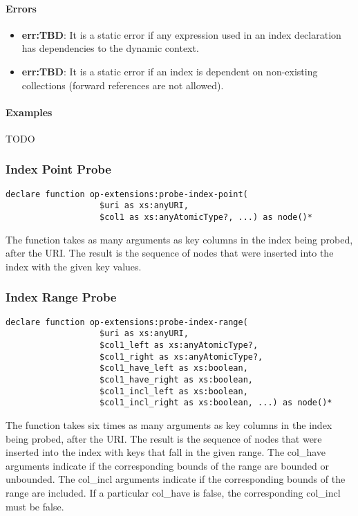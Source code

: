 \documentclass[]{article}
\begin{document}
\paragraph{Errors}
\begin{itemize}
  \item \textbf{err:TBD}: It is a static error if any expression used in an index declaration has dependencies to the dynamic context.
  \item \textbf{err:TBD}: It is a static error if an index is dependent on non-existing collections (forward references are not allowed).
\end{itemize}

\paragraph{Examples}
TODO

\subsubsection{Index Point Probe}
\begin{verbatim}
declare function op-extensions:probe-index-point(
                   $uri as xs:anyURI, 
                   $col1 as xs:anyAtomicType?, ...) as node()*
\end{verbatim}

\noindent
The function takes as many arguments as key columns in the index being probed, after the URI. The result is the sequence of nodes that were inserted into the index with the given key values.

\subsubsection{Index Range Probe}
\begin{verbatim}
declare function op-extensions:probe-index-range(
                   $uri as xs:anyURI,
                   $col1_left as xs:anyAtomicType?,
                   $col1_right as xs:anyAtomicType?,
                   $col1_have_left as xs:boolean,
                   $col1_have_right as xs:boolean,
                   $col1_incl_left as xs:boolean,
                   $col1_incl_right as xs:boolean, ...) as node()*
\end{verbatim}

\noindent
The function takes six times as many arguments as key columns in the index being probed, after the URI. The result is the sequence of nodes that were inserted into the index with keys that fall in the given range. The col\_have arguments indicate if the corresponding bounds of the range are bounded or unbounded. The col\_incl arguments indicate if the corresponding bounds of the range are included. If a particular col\_have is false, the corresponding col\_incl must be false.
\end{document}

